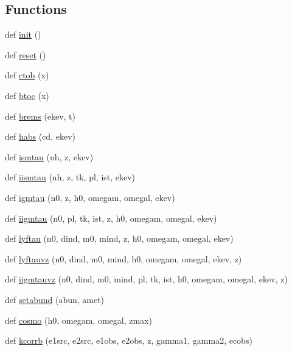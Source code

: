 \subsection*{Functions}
\begin{DoxyCompactItemize}
\item 
def \hyperlink{namespaceastro_afd2c493707f37b92d28be18ec3375a98}{init} ()
\item 
def \hyperlink{namespaceastro_a65ea3862ae8a5d037c27c686f159c1e0}{reset} ()
\item 
def \hyperlink{namespaceastro_a214f13a490e598ad3f9a73eaa5a0c522}{ctob} (x)
\item 
def \hyperlink{namespaceastro_ac33d063fb308b84fa6d78e4316d225cc}{btoc} (x)
\item 
def \hyperlink{namespaceastro_ae210e281dcd0615b0b93a5e37ab2e155}{brems} (ekev, t)
\item 
def \hyperlink{namespaceastro_a2affbbac80a8c00684373d8ccb26ef26}{habs} (cd, ekev)
\item 
def \hyperlink{namespaceastro_a490b2c8ec99e8c27321a6033a1c6112e}{ismtau} (nh, z, ekev)
\item 
def \hyperlink{namespaceastro_afd6fe35b31d85f090f917bfaf3551b99}{iismtau} (nh, z, tk, pl, ist, ekev)
\item 
def \hyperlink{namespaceastro_a6d5632e077159fa53d0bd70d4a288c8a}{igmtau} (n0, z, h0, omegam, omegal, ekev)
\item 
def \hyperlink{namespaceastro_a6947448febcabe92f263054182b99ae7}{iigmtau} (n0, pl, tk, ist, z, h0, omegam, omegal, ekev)
\item 
def \hyperlink{namespaceastro_a356be8e8b6fafe3b3af92710b9a328cf}{lyftau} (n0, dind, m0, mind, z, h0, omegam, omegal, ekev)
\item 
def \hyperlink{namespaceastro_a4273aff2ae289e312c7c1dd4ece3b019}{lyftauvz} (n0, dind, m0, mind, h0, omegam, omegal, ekev, z)
\item 
def \hyperlink{namespaceastro_ae81a9bc5a1142a81996fcb0c71e1996a}{iigmtauvz} (n0, dind, m0, mind, pl, tk, ist, h0, omegam, omegal, ekev, z)
\item 
def \hyperlink{namespaceastro_af9c1feca763b33c851262015830fc858}{setabund} (abun, amet)
\item 
def \hyperlink{namespaceastro_a952304e1afa9abfc8d33a7e34eb47e38}{cosmo} (h0, omegam, omegal, zmax)
\item 
def \hyperlink{namespaceastro_a242d13266dd9fc08ce3ca8b731fba278}{kcorrb} (e1src, e2src, e1obs, e2obs, z, gamma1, gamma2, ecobs)
\end{DoxyCompactItemize}


